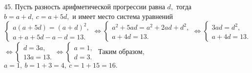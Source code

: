 45. Пусть разность арифметической прогрессии равна $d,$ тогда $b=a+d,\ c=a+5d,$ и имеет место система уравнений
$\begin{cases} a(a+5d)=(a+d)^2,\\ a+a+5d-a-d=13.\end{cases}\Leftrightarrow\begin{cases} a^2+5ad=a^2+2ad+d^2,\\ a+4d=13.\end{cases}\Leftrightarrow
\begin{cases} 3ad=d^2,\\ a+4d=13.\end{cases}$\\$\Leftrightarrow\begin{cases} d=3a,\\ 13a=13.\end{cases}
\Leftrightarrow\begin{cases} a=1,\\ d=3.\end{cases}$ Таким образом, $a=1,\ b=1+3=4,\ c=1+15=16.$\\
